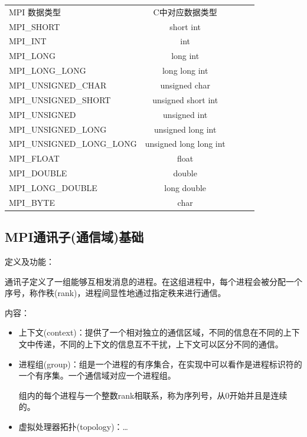 \documentclass[UTF8]{article}%
\begin{document}
\begin{tabular}{l c c c r}
    MPI 数据类型                 &	C中对应数据类型           \\
    MPI\_SHORT                  &	short int               \\
    MPI\_INT	                &   int                     \\
    MPI\_LONG	                &   long int                \\
    MPI\_LONG\_LONG	            &   long long int           \\
    MPI\_UNSIGNED\_CHAR         &	unsigned char           \\
    MPI\_UNSIGNED\_SHORT	    &   unsigned short int      \\
    MPI\_UNSIGNED	            &   unsigned int            \\
    MPI\_UNSIGNED\_LONG	        &   unsigned long int       \\
    MPI\_UNSIGNED\_LONG\_LONG	&   unsigned long long int  \\
    MPI\_FLOAT	                &   float                   \\
    MPI\_DOUBLE	                &   double                  \\
    MPI\_LONG\_DOUBLE	        &   long double             \\
    MPI\_BYTE	                &   char                    \\
\end{tabular}


\subsection{MPI通讯子(通信域)基础}

定义及功能：

通讯子定义了一组能够互相发消息的进程。在这组进程中，每个进程会被分配一个序号，称作秩(rank)，进程间显性地通过指定秩来进行通信。

内容：
\begin{itemize}
    \item 上下文(context)：提供了一个相对独立的通信区域，不同的信息在不同的上下文中传递，不同的上下文的信息互不干扰，上下文可以区分不同的通信。
    \item 进程组(group)：组是一个进程的有序集合，在实现中可以看作是进程标识符的一个有序集。一个通信域对应一个进程组。

    组内的每个进程与一个整数rank相联系，称为序列号，从0开始并且是连续的。

    \item 虚拟处理器拓扑(topology)：\dots
\end{itemize}
\end{document}
